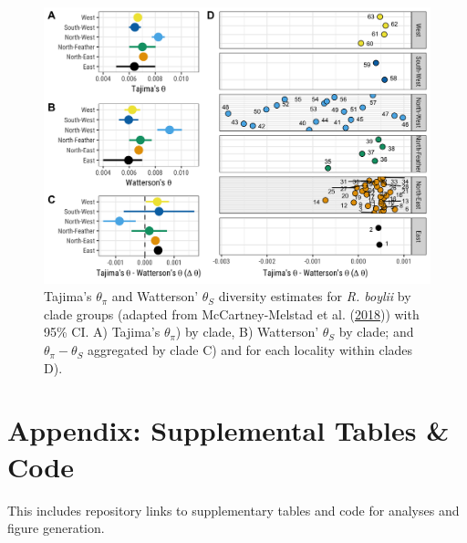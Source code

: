 \documentclass[proquest,12pt,final]{ucthesis-CA2012} %
\begin{document}
\begin{ucmainmatter}
\begin{figure}

{\centering \includegraphics[width=0.95\linewidth]{figure/ch3/fig_06_thetas_taj_watt_tdiff_95CI_fig06} 

}

\caption{Tajima's \(\theta_\pi\) and Watterson' \(\theta_S\)
diversity estimates for \emph{R. boylii} by clade groups (adapted from
McCartney-Melstad et al.
(\protect\hyperlink{ref-mccartney-melstad_population_2018}{2018})) with
95\% CI. A) Tajima's \(\theta_\pi\)) by clade, B) Watterson'
\(\theta_S\) by clade; and \(\theta_\pi - \theta_S\) aggregated by clade
C) and for each locality within clades D).}\label{fig:CH3F6thetas}
\end{figure}
\clearpage

\appendix

\hypertarget{appendix-supplemental-tables-code}{%
\chapter{Appendix: Supplemental Tables \&
Code}\label{appendix-supplemental-tables-code}}

This includes repository links to supplementary tables and code for
analyses and figure generation.

\hypertarget{supptables}{%
}
\end{ucmainmatter}
\end{document}
